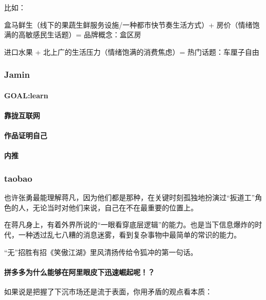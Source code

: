 \documentclass[letterpaper,11pt,english]{sphinxmanual}
\begin{document}
比如：

盒马鲜生（线下的果蔬生鲜服务设施/一种都市快节奏生活方式）+
房价（情绪饱满的高敏感民生话题）= 品牌概念：盒区房

进口水果 + 北上广的生活压力（情绪饱满的消费焦虑）= 热门话题：车厘子自由


\subsubsection{Jamin}
\label{\detokenize{chapter_experience/Jamin:jamin}}\label{\detokenize{chapter_experience/Jamin::doc}}

\paragraph{GOAL:learn}
\label{\detokenize{chapter_experience/Jamin:goal-learn}}

\paragraph{靠拢互联网}
\label{\detokenize{chapter_experience/Jamin:id1}}

\paragraph{作品证明自己}
\label{\detokenize{chapter_experience/Jamin:id2}}

\paragraph{内推}
\label{\detokenize{chapter_experience/Jamin:id3}}

\subsubsection{taobao}
\label{\detokenize{chapter_experience/taobao:taobao}}\label{\detokenize{chapter_experience/taobao::doc}}
也许张勇最能理解蒋凡，因为他们都是那种，在关键时刻孤独地扮演过“扳道工”角色的人，无论当时对他们来说，自己在不在最重要的位置上。

在蒋凡身上，有着外界所说的“一眼看穿底层逻辑”的能力。也是当下信息爆炸的时代，一种透过乱七八糟的消息迷雾，看到复杂事物中最简单的常识的能力。

“无”招胜有招《笑傲江湖》里风清扬传给令狐冲的第一句话。


\paragraph{拼多多为什么能够在阿里眼皮下迅速崛起呢！？}
\label{\detokenize{chapter_experience/taobao:id1}}
如果说是把握了下沉市场还是流于表面，你用矛盾的观点看本质：
\end{document}
